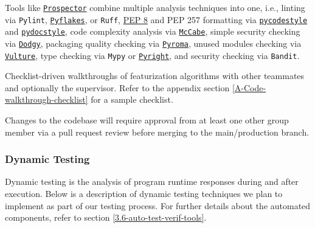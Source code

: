 \documentclass[12pt, titlepage]{article}
\begin{document}
\begin{description}[style=unboxed,leftmargin=0cm]
  \item[Composite Analysis Techniques] Tools like \href{https://radon.readthedocs.io/en/stable/index.html}{\texttt{Prospector}} combine multiple analysis techniques into one, i.e., linting via \texttt{Pylint}, \href{https://launchpad.net/pyflakes}{\texttt{Pyflakes}}, or \texttt{Ruff}, \href{https://peps.python.org/pep-8}{PEP 8} and PEP 257 formatting via \href{https://pycodestyle.pycqa.org/en/stable/}{\texttt{pycodestyle}} and \href{https://www.pydocstyle.org/en/stable/}{\texttt{pydocstyle}}, code complexity analysis via \href{https://flake8.pycqa.org/en/stable/}{\texttt{McCabe}}, simple security checking via \href{https://github.com/prospector-dev/dodgy}{\texttt{Dodgy}}, packaging quality checking via \href{https://github.com/regebro/pyroma}{\texttt{Pyroma}}, unused modules checking via \href{https://github.com/jendrikseipp/vulture}{\texttt{Vulture}}, type checking via \texttt{Mypy} or \href{https://microsoft.github.io/pyright/}{\texttt{Pyright}}, and security checking via \texttt{Bandit}.
  
  \item[Code Walkthroughs] Checklist-driven walkthroughs of featurization algorithms with other teammates and optionally the supervisor. Refer to the appendix section \ref{A-Code-walkthrough-checklist} for a sample checklist.
  
  \item[Peer Desk Checks] Changes to the codebase will require approval from at least one other group member via a pull request review before merging to the main/production branch.
\end{description}

\subsubsection{Dynamic Testing}
Dynamic testing is the analysis of program runtime responses during and after execution. Below is a description of dynamic testing techniques we plan to implement as part of our testing process. For further details about the automated components, refer to section \ref{3.6-auto-test-verif-tools}.
\end{document}
